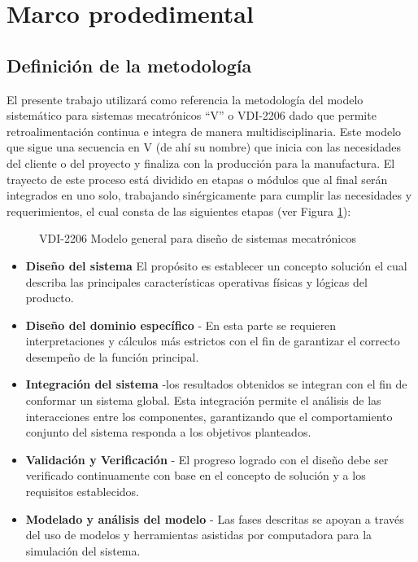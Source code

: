
\section{Marco prodedimental}


\subsection{Definición de la metodología}

El presente trabajo utilizará como referencia la metodología del modelo sistemático para sistemas mecatrónicos ``V'' o  VDI-2206 \cite{gausemeier2003new} dado que permite retroalimentación continua e integra de manera multidisciplinaria. Este modelo que sigue una secuencia en V (de ahí su nombre) que inicia con las necesidades del cliente o del proyecto y finaliza con la producción para la manufactura. El trayecto de este proceso está dividido en etapas o módulos que al final serán integrados en uno solo, trabajando sinérgicamente para cumplir las necesidades y requerimientos, el cual consta de las siguientes etapas (ver Figura \ref{fig:vdi-modelo}):


\begin{figure}[h]
\centering
\caption{VDI-2206 Modelo general para diseño de sistemas mecatrónicos}
\label{fig:vdi-modelo}
\end{figure}

\begin{itemize}
    \item \textbf{Diseño del sistema} El propósito es establecer un concepto solución el cual describa las principales características operativas físicas y lógicas del producto. %
    \item \textbf{Diseño del dominio específico} - En esta parte se requieren interpretaciones y cálculos más estrictos con el fin de garantizar el correcto desempeño de la función principal.
    \item \textbf{Integración del sistema} -los resultados obtenidos  se integran con el fin de conformar un sistema global. Esta integración permite el análisis de las interacciones entre los componentes, garantizando que el comportamiento conjunto del sistema responda a los objetivos planteados.
    \item \textbf{Validación y Verificación} - El progreso logrado con el diseño debe ser verificado continuamente con base en el concepto de solución  y a los requisitos establecidos.
    \item \textbf{Modelado y análisis del modelo} - Las fases descritas se apoyan a través del uso de modelos y herramientas asistidas por computadora para la simulación del sistema.
\end{itemize}


